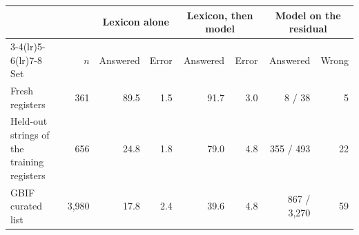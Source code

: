 \begin{tabular}{lrrrrrrr}
\toprule
& & \multicolumn{2}{c}{Lexicon alone} & \multicolumn{2}{c}{Lexicon, then model} & \multicolumn{2}{c}{Model on the residual} \\
\cmidrule(lr){3-4}\cmidrule(lr){5-6}\cmidrule(lr){7-8}
Set & $n$ & Answered & Error & Answered & Error & Answered & Wrong \\
\midrule
Fresh registers & 361 & 89.5 & 1.5 & 91.7 & 3.0 & 8 / 38 & 5 \\
Held-out strings of the training registers & 656 & 24.8 & 1.8 & 79.0 & 4.8 & 355 / 493 & 22 \\
GBIF curated list & 3{,}980 & 17.8 & 2.4 & 39.6 & 4.8 & 867 / 3{,}270 & 59 \\
\bottomrule
\end{tabular}
